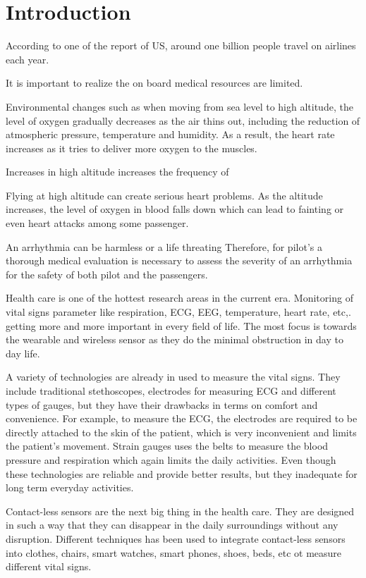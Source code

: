 \chapter{Introduction}

According to one of the report of US, around one billion people travel on airlines each year.

It is important to realize the on board medical resources are limited.

Environmental changes such as when moving from sea level to high altitude, the level of oxygen gradually decreases as the air thins out, including the reduction of atmospheric pressure, temperature and humidity. As a result, the heart rate increases as it tries to deliver more oxygen to the muscles.

Increases in high altitude increases the frequency of  

Flying at high altitude can create serious heart problems. As the altitude increases, the level of oxygen in blood falls down which can lead to fainting or even heart attacks among some passenger.



An arrhythmia can be harmless or a life threating Therefore, for pilot's a thorough medical evaluation is necessary to assess the severity of an arrhythmia for the safety of both pilot and the passengers.





Health care is one of the hottest research areas in the current era. Monitoring of vital signs parameter like respiration, ECG, EEG, temperature, heart rate, etc,. getting more and more important in every field of life. The most focus is towards the wearable and wireless sensor as they do the minimal obstruction in day to day life.

A variety of technologies are already in used to measure the vital signs. They include traditional stethoscopes, electrodes for measuring ECG and different types of gauges, but they have their drawbacks in terms on comfort and convenience. For example, to measure the ECG, the electrodes are required to be directly attached to the skin of the patient, which is very inconvenient and limits the patient's movement. Strain gauges uses the belts to measure the blood pressure and respiration which again limits the daily activities. Even though these technologies are reliable and provide better results, but they inadequate for long term everyday activities.

Contact-less sensors are the next big thing in the health care. They are designed in such a way that they can disappear in the daily surroundings without any disruption. Different techniques has been used to integrate contact-less sensors into clothes, chairs, smart watches, smart phones, shoes, beds, etc ot measure different vital signs.


